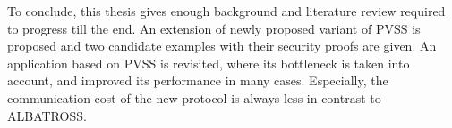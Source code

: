To conclude, this thesis gives enough background and literature review required to 
progress till the end. An extension of newly proposed variant of PVSS is proposed and 
two candidate examples with their security proofs are given. An application based on PVSS 
is revisited, where its bottleneck is taken into account, and improved its performance 
in many cases. Especially, the communication cost of the new protocol is always less in 
contrast to ALBATROSS.


